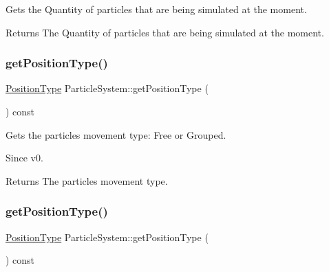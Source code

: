 Gets the Quantity of particles that are being simulated at the moment.

\begin{DoxyReturn}{Returns}
The Quantity of particles that are being simulated at the moment. 
\end{DoxyReturn}
\mbox{\label{classParticleSystem_a946e4bbab07799809fd21d4d9eee8ebb}} 
\subsubsection{\texorpdfstring{get\+Position\+Type()}{getPositionType()}\hspace{0.1cm}{\footnotesize\ttfamily [1/2]}}
{\footnotesize\ttfamily \hyperlink{classParticleSystem_a9856f9eca1df7c6f2a2e54a1549cff27}{Position\+Type} Particle\+System\+::get\+Position\+Type (\begin{DoxyParamCaption}{ }\end{DoxyParamCaption}) const\hspace{0.3cm}{\ttfamily [inline]}}

Gets the particles movement type\+: Free or Grouped. \begin{DoxySince}{Since}
v0.
\end{DoxySince}
\begin{DoxyReturn}{Returns}
The particles movement type. 
\end{DoxyReturn}
\mbox{\label{classParticleSystem_a946e4bbab07799809fd21d4d9eee8ebb}} 
\subsubsection{\texorpdfstring{get\+Position\+Type()}{getPositionType()}\hspace{0.1cm}{\footnotesize\ttfamily [2/2]}}
{\footnotesize\ttfamily \hyperlink{classParticleSystem_a9856f9eca1df7c6f2a2e54a1549cff27}{Position\+Type} Particle\+System\+::get\+Position\+Type (\begin{DoxyParamCaption}{ }\end{DoxyParamCaption}) const\hspace{0.3cm}{\ttfamily [inline]}}

